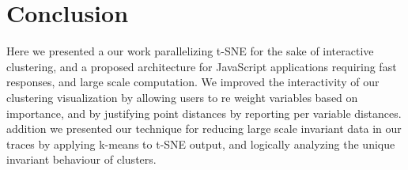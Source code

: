 \section{Conclusion}
\label{sec:conclusion}

Here we presented a our work parallelizing t-SNE for the sake of
interactive clustering, and a proposed architecture for JavaScript
applications requiring fast responses, and large scale computation. We
improved the interactivity of our clustering visualization by allowing
users to re weight variables based on importance, and by justifying
point distances by reporting per variable distances.  addition we
presented our technique for reducing large scale invariant data in our
traces by applying k-means to t-SNE output, and logically analyzing the
unique invariant behaviour of clusters.

